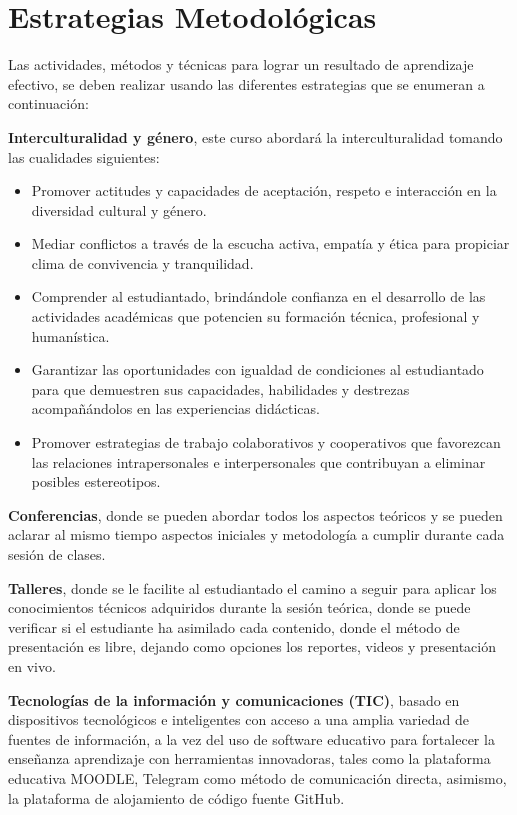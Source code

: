 \section{Estrategias Metodológicas}

Las actividades, métodos y técnicas para lograr un resultado de aprendizaje efectivo, se deben realizar usando las diferentes estrategias que se enumeran a continuación:

\textbf{Interculturalidad y género}, este curso abordará la interculturalidad tomando las cualidades siguientes:\

\begin{itemize}[itemsep=0.6em, wide=1cm, leftmargin=*]
    \item Promover actitudes y capacidades de aceptación, respeto e interacción en la diversidad cultural y género.
    \item Mediar conflictos a través de la escucha activa, empatía y ética para propiciar clima de convivencia y tranquilidad.
    \item Comprender al estudiantado, brindándole confianza en el desarrollo de las actividades académicas que potencien su formación técnica, profesional y humanística.
    \item Garantizar las oportunidades con igualdad de condiciones al estudiantado para que demuestren sus capacidades, habilidades y destrezas acompañándolos en las experiencias didácticas.
    \item Promover estrategias de trabajo colaborativos y cooperativos que favorezcan las relaciones intrapersonales e interpersonales que contribuyan a eliminar posibles estereotipos.
\end{itemize}

\textbf{Conferencias}, donde se pueden abordar todos los aspectos teóricos y se pueden aclarar al mismo tiempo aspectos iniciales y metodología a cumplir durante cada sesión de clases.

\textbf{Talleres}, donde se le facilite al estudiantado el camino a seguir para aplicar los conocimientos técnicos adquiridos durante la sesión teórica, donde se puede verificar si el estudiante ha asimilado cada contenido, donde el método de presentación es libre, dejando como opciones los reportes, videos y presentación en vivo.

\textbf{Tecnologías de la información y comunicaciones (TIC)}, basado en dispositivos tecnológicos e inteligentes con acceso a una amplia variedad de fuentes de información, a la vez del uso de software educativo para fortalecer la enseñanza aprendizaje con herramientas innovadoras, tales como la plataforma educativa MOODLE, Telegram como método de comunicación directa, asimismo, la plataforma de alojamiento de código fuente GitHub.

